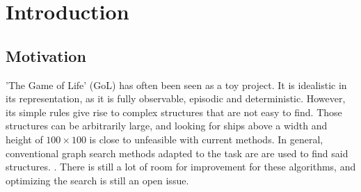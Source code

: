 \documentclass{l4proj}
\begin{document}
\tableofcontents

%
%
%
%
%
%
%
%
\chapter{Introduction}


\section{Motivation}

'The Game of Life' (GoL) has often been seen as a toy project. It is idealistic in its representation, as it is fully observable, episodic and deterministic. However, its simple rules give rise to complex structures that are not easy to find. Those structures can be arbitrarily large, and looking for ships above a width and height of $100 \times 100$ is close to unfeasible with current methods. In general, conventional graph search methods adapted to the task are are used to find said structures. \citep{list_of_search_algorithms}. There is still a lot of room for improvement for these algorithms, and optimizing the search is still an open issue.
\end{document}
